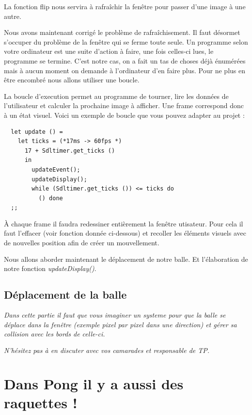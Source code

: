 \documentclass[a4paper]{article}
\begin{document}
\noindent
La fonction flip nous servira à rafraîchir la fenêtre pour passer d'une image à une autre.\bigskip

Nous avons maintenant corrigé le problème de rafraîchisement. Il faut désormet s'occuper du problème de la fenêtre qui se ferme toute seule. Un programme selon votre ordinateur est une suite d'action à faire, une fois celles-ci lues, le programme se termine. C'est notre cas, on a fait un tas de choses déjà énumérées mais à aucun moment on demande à l'ordinateur d'en faire plus. Pour ne plus en être encombré nous allons utiliser une boucle. \par

La boucle d'execution permet au programme de tourner, lire les données de l'utilisateur et calculer la prochaine image à afficher. Une frame correspond donc à un état visuel. Voici un exemple de boucle que vous pouvez adapter au projet :

\begin{lstlisting}
  let update () =
    let ticks = (*17ms -> 60fps *)
      17 + Sdltimer.get_ticks ()
      in
        updateEvent();
        updateDisplay();
        while (Sdltimer.get_ticks ()) <= ticks do
          () done
  ;;
\end{lstlisting}

À chaque frame il faudra redessiner entièrement la fenêtre utisateur. Pour cela il faut l'effacer (voir fonction donnée ci-dessous) et recoller les éléments visuels avec de nouvelles position afin de créer un mouvellement.\par
Nous allons aborder maintenant le déplacement de notre balle. Et l'élaboration de notre fonction \textit{updateDisplay()}.

\subsection{Déplacement de la balle}

\textit{
Dans cette partie il faut que vous imaginer un systeme pour que la balle se déplace dans la fenêtre (exemple pixel par pixel dans une direction) et gérer sa collision avec les bords de celle-ci.
}\par\smallskip
\textit{N'hésitez pas à en discuter avec vos camarades et responsable de TP.}

\section{Dans Pong il y a aussi des raquettes !}
\end{document}
